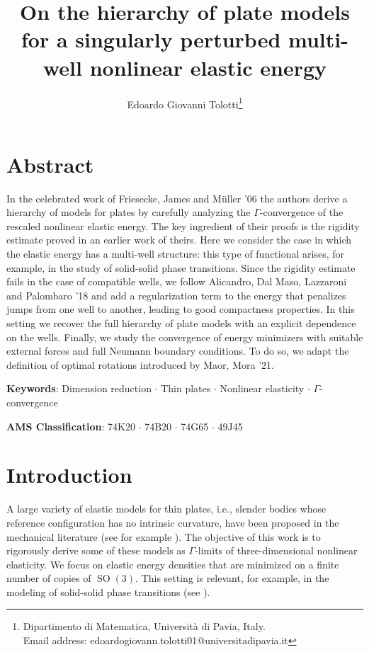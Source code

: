 \documentclass{article}
\title{On the hierarchy of plate models for a singularly perturbed multi-well nonlinear elastic energy}
\author{Edoardo Giovanni Tolotti\footnote{Dipartimento di Matematica, Universit\`a di Pavia, Italy. \\ \indent Email address: edoardogiovann.tolotti01@universitadipavia.it} \hspace{.5mm} \orcidlink{0009-0004-3279-245X}}
\date{}
\theoremstyle{plain}
\theoremstyle{plain}
\theoremstyle{plain}
\theoremstyle{plain}
\theoremstyle{plain}
\theoremstyle{definition}
\theoremstyle{definition}
\DeclareMathOperator{\SO}{SO}
\begin{document}
\maketitle
\let\thefootnote\relax{}
\thispagestyle{empty}

\section*{Abstract}

In the celebrated work of Friesecke, James and M\"uller '06 the authors derive a hierarchy of models for plates by carefully analyzing the $\Gamma$-convergence of the rescaled nonlinear elastic energy. The key ingredient of their proofs is the rigidity estimate proved in an earlier work of theirs. Here we consider the case in which the elastic energy has a multi-well structure: this type of functional arises, for example, in the study of solid-solid phase transitions. Since the rigidity estimate fails in the case of compatible wells, we follow Alicandro, Dal Maso, Lazzaroni and Palombaro '18 and add a regularization term to the energy that penalizes jumps from one well to another, leading to good compactness properties. In this setting we recover the full hierarchy of plate models with an explicit dependence on the wells. Finally, we study the convergence of energy minimizers with suitable external forces and full Neumann boundary conditions. To do so, we adapt the definition of optimal rotations introduced by Maor, Mora '21.

\vspace{.2cm}

\noindent\textbf{Keywords}: Dimension reduction $\cdot$ Thin plates $\cdot$ Nonlinear elasticity $\cdot$ $\Gamma$-convergence

\noindent\textbf{AMS Classification}: 74K20 $\cdot$ 74B20 $\cdot$ 74G65 $\cdot$ 49J45


\section*{Introduction}

A large variety of elastic models for thin plates, i.e., slender bodies whose reference configuration has no intrinsic curvature, have been proposed in the mechanical literature (see for example \cite{CIARLET1997, ANTMAN2005, LOVE1927, VONKARMAN1907}). The objective of this work is to rigorously derive some of these models as $\Gamma$-limits of three-dimensional nonlinear elasticity. We focus on elastic energy densities that are minimized on a finite number of copies of $\SO(3)$.
This setting is relevant, for example, in the modeling of solid-solid phase transitions (see \cite{BALL1987}).
\end{document}
